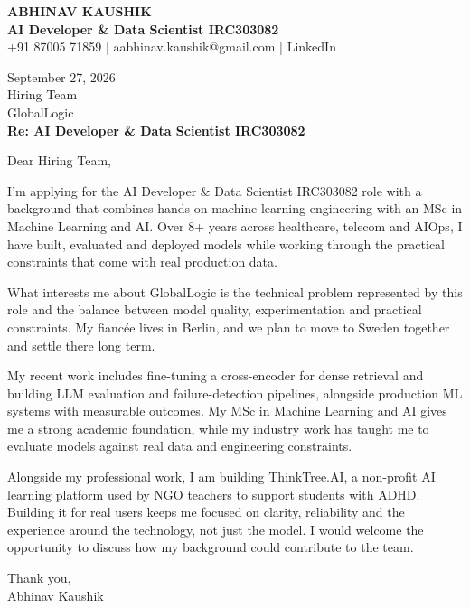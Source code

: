 \documentclass[10pt,a4paper]{article}
\begin{document}
\begin{center}
{\Large\bfseries ABHINAV KAUSHIK}\\[2pt]
{\bfseries AI Developer \& Data Scientist IRC303082}\\[2pt]
+91 87005 71859 \quad | \quad aabhinav.kaushik@gmail.com \quad | \quad LinkedIn
\end{center}
\vspace{8pt}
September 27, 2026\\[6pt]
Hiring Team\\
GlobalLogic\\[4pt]
\textbf{Re: AI Developer \& Data Scientist IRC303082}

Dear Hiring Team,

I’m applying for the AI Developer \& Data Scientist IRC303082 role with a background that combines hands-on machine learning engineering with an MSc in Machine Learning and AI. Over 8+ years across healthcare, telecom and AIOps, I have built, evaluated and deployed models while working through the practical constraints that come with real production data.

What interests me about GlobalLogic is the technical problem represented by this role and the balance between model quality, experimentation and practical constraints. My fiancée lives in Berlin, and we plan to move to Sweden together and settle there long term.

My recent work includes fine-tuning a cross-encoder for dense retrieval and building LLM evaluation and failure-detection pipelines, alongside production ML systems with measurable outcomes. My MSc in Machine Learning and AI gives me a strong academic foundation, while my industry work has taught me to evaluate models against real data and engineering constraints.

Alongside my professional work, I am building ThinkTree.AI, a non-profit AI learning platform used by NGO teachers to support students with ADHD. Building it for real users keeps me focused on clarity, reliability and the experience around the technology, not just the model. I would welcome the opportunity to discuss how my background could contribute to the team.

Thank you,\\
Abhinav Kaushik
\end{document}
